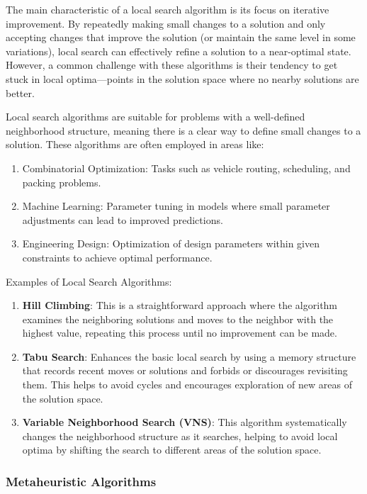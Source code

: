 \documentclass[
]{article}
\begin{document}
The main characteristic of a local search algorithm is its focus on iterative improvement. By repeatedly making small changes to a solution and only accepting changes that improve the solution (or maintain the same level in some variations), local search can effectively refine a solution to a near-optimal state. However, a common challenge with these algorithms is their tendency to get stuck in local optima—points in the solution space where no nearby solutions are better.

Local search algorithms are suitable for problems with a well-defined neighborhood structure, meaning there is a clear way to define small changes to a solution. These algorithms are often employed in areas like:

\begin{enumerate}
  \item Combinatorial Optimization: Tasks such as vehicle routing, scheduling, and packing problems.
  \item Machine Learning: Parameter tuning in models where small parameter adjustments can lead to improved predictions.
  \item Engineering Design: Optimization of design parameters within given constraints to achieve optimal performance.
\end{enumerate}

Examples of Local Search Algorithms:
\begin{enumerate}
  \item \textbf{Hill Climbing}: This is a straightforward approach where the algorithm examines the neighboring solutions and moves to the neighbor with the highest value, repeating this process until no improvement can be made.
  \item \textbf{Tabu Search}: Enhances the basic local search by using a memory structure that records recent moves or solutions and forbids or discourages revisiting them. This helps to avoid cycles and encourages exploration of new areas of the solution space.
  \item \textbf{Variable Neighborhood Search (VNS)}: This algorithm systematically changes the neighborhood structure as it searches, helping to avoid local optima by shifting the search to different areas of the solution space.
\end{enumerate}


\hypertarget{metaheuristic-algorithms}{%
  \subsubsection{Metaheuristic Algorithms}\label{metaheuristic-algorithms}}
\end{document}
